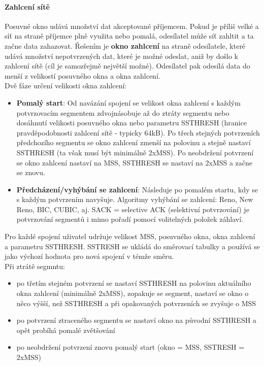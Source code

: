 \documentclass[10pt,a4paper]{article}
\begin{document}
\paragraph{Zahlcení sítě} Posuvné okno udává množství dat akceptované příjemcem. Pokud je příliš velké a síť na straně příjemce plně využita nebo pomalá, odesílatel může síť zahltit a ta začne data zahazovat. Řešením je \textbf{okno zahlcení} na straně odesílatele, které udává množství nepotvrzených dat, které je možné odeslat, aniž by došlo k zahlcení sítě (cíl je samozřejmě největší možné). Odesílatel pak odesílá data do menší z velikostí posuvného okna a okna zahlcení. \\
Dvě fáze určení velikosti okna zahlcení:
\begin{itemize}
	\item \textbf{Pomalý start}: Od navázání spojení se velikost okna zahlcení s každým potvrzovacím segmentem zdvojnásobuje až do ztráty segmentu nebo dosáhnutí velikosti posuvného okna nebo parametru SSTHRESH (hranice pravděpodobnosti zahlcení sítě - typicky 64kB). Po třech stejných potvrzeních předchozího segmentu se okno zahlcení zmenší na polovinu a stejně nastaví SSTHRESH (ta však musí být minimálně 2xMSS). Po neobdržení potvrzení se okno zahlcení nastaví na MSS, SSTHRESH se nastaví na 2xMSS a začne se znovu.
	\item \textbf{Předcházení/vyhýbání se zahlcení}: Následuje po pomalém startu, kdy se s každým potvrzením navyšuje. Algoritmy vyhýbání se zahlcení: Reno, New Reno, BIC, CUBIC, aj. SACK = selective ACK (selektivní potvrzování) je potvrzování segmentů i mimo pořadí pomocí volitelných položek záhlaví.
\end{itemize}
Pro každé spojení uživatel udržuje velikost MSS, posuvného okna, okna zahlcení a parametru SSTHRESH. SSTRESH se ukládá do směrovací tabulky a používá se jako výchozí hodnota pro nová spojení v témže směru.\\
Při ztrátě segmntu:
\begin{itemize}
	\item po třetím stejném potvrzení se nastaví SSTHRESH na polovinu aktuálního okna zahlcení (minimálně 2xMSS), zopakuje se segment, nastaví se okno o něco výšší, než SSTHRESH a při opakovaných potvrzeních se zvyšuje o MSS
	\item po potvrzení ztraceného segmentu se nastaví okno na původní SSTHRESH a opět probíhá pomalé zvětšování
	\item po neobdržení potvrzení znovu pomalý start (okno = MSS, SSTRESH = 2xMSS)
\end{itemize}
\end{document}
